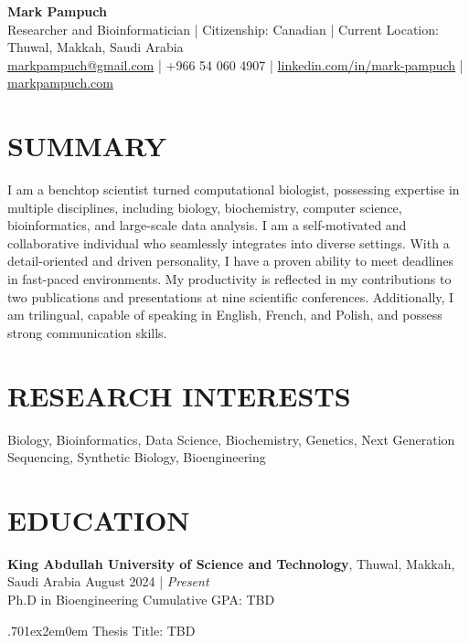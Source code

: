 \documentclass[a4paper,9pt]{extarticle}
\begin{document}
\pagestyle{fancy}
\renewcommand{\headrulewidth}{0pt}
\fancyhead{}
\thispagestyle{empty} %

\begin{flushleft}
	\textbf{\huge Mark Pampuch}\\[2pt] 
	Researcher and Bioinformatician | Citizenship: Canadian | Current Location: Thuwal, Makkah, Saudi Arabia
	\\ \href{mailto:markpampuch@gmail.com}{markpampuch@gmail.com} | +966 54 060 4907 | \href{https://www.linkedin.com/in/mark-pampuch/}{linkedin.com/in/mark-pampuch} | \href{https://markpampuch.com}{markpampuch.com} 
\end{flushleft}

\section*{SUMMARY}
\noindent
I am a benchtop scientist turned computational biologist, possessing expertise in multiple disciplines, including biology, biochemistry, computer science, bioinformatics, and large-scale data analysis. I am a self-motivated and collaborative individual who seamlessly integrates into diverse settings. With a detail-oriented and driven personality, I have a proven ability to meet deadlines in fast-paced environments. My productivity is reflected in my contributions to two publications and presentations at nine scientific conferences. Additionally, I am trilingual, capable of speaking in English, French, and Polish, and possess strong communication skills. 


\section*{RESEARCH INTERESTS}
\noindent
Biology, Bioinformatics, Data Science, Biochemistry, Genetics, Next Generation Sequencing, Synthetic Biology, Bioengineering

\section*{EDUCATION}
\noindent
\begin{minipage}{1\textwidth}
\textbf{King Abdullah University of Science and Technology}, Thuwal, Makkah, Saudi Arabia \hfill August 2024 | \textit{Present}\\ 
Ph.D in Bioengineering \hfill Cumulative GPA: TBD \par %
{\hsize.70\linewidth\parskip1ex\hangindent2em\parindent0em 
	\setlength{\parskip}{0pt} %
Thesis Title: TBD\par}
\end{minipage}
\vspace{\parskip}
\end{document}
